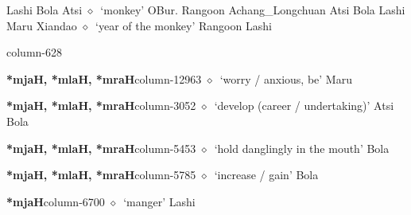          Lashi 
\hspace{1ex}
         Bola 
\hspace{1ex}
         Atsi 
\hspace{1ex}
         $\diamond$~`monkey'
         OBur. 
\hspace{1ex}
         Rangoon 
\hspace{1ex}
         Achang\_Longchuan 
\hspace{1ex}
         Atsi 
\hspace{1ex}
         Bola 
\hspace{1ex}
         Lashi 
\hspace{1ex}
         Maru 
\hspace{1ex}
         Xiandao 
\hspace{1ex}
         $\diamond$~`year of the monkey'
         Rangoon 
\hspace{1ex}
         Lashi 
  \item {\footnotesize \textbf{}}{\tiny column-628}
  \item {\footnotesize \textbf{*mjaH, *mlaH, *mraH}}{\tiny column-12963}
         $\diamond$~`worry / anxious, be'
         Maru 
  \item {\footnotesize \textbf{*mjaH, *mlaH, *mraH}}{\tiny column-3052}
         $\diamond$~`develop (career / undertaking)'
         Atsi 
\hspace{1ex}
         Bola 
  \item {\footnotesize \textbf{*mjaH, *mlaH, *mraH}}{\tiny column-5453}
         $\diamond$~`hold danglingly in the mouth'
         Bola 
  \item {\footnotesize \textbf{*mjaH, *mlaH, *mraH}}{\tiny column-5785}
         $\diamond$~`increase / gain'
         Bola 
  \item {\footnotesize \textbf{*mjaH}}{\tiny column-6700}
         $\diamond$~`manger'
         Lashi 
